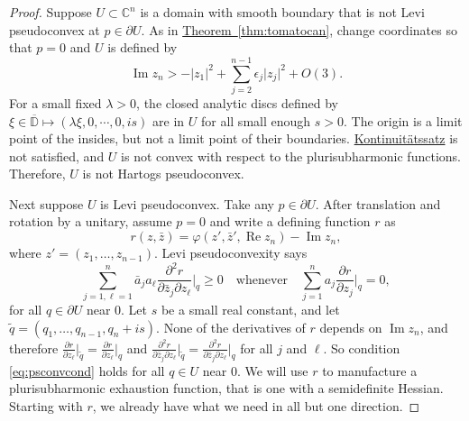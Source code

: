 \documentclass[12pt,openany]{book}
\renewcommand{\Re}{\operatorname{Re}}
\renewcommand{\Im}{\operatorname{Im}}
\newcommand{\sabs}[1]{\lvert {#1} \rvert}
\newcommand{\C}{{\mathbb{C}}}
\newcommand{\D}{{\mathbb{D}}}
\theoremstyle{plain}
\theoremstyle{remark}
\theoremstyle{definition}
\theoremstyle{exercise}
\theoremstyle{example}
\newcommand{\thmref}[1]{\hyperref[#1]{Theorem~\ref*{#1}}}
\begin{document}
\begin{proof}
Suppose
$U \subset \C^n$ is a domain with smooth boundary that is not
Levi pseudoconvex at $p \in \partial U$.
As in
\thmref{thm:tomatocan}, change coordinates so that $p=0$ and $U$ is defined
by
\begin{equation*}
\Im z_n > - \sabs{z_1}^2 + \sum_{j=2}^{n-1} \epsilon_j \sabs{z_j}^2 + O(3) .
\end{equation*}
For a small fixed $\lambda > 0$, the
closed analytic discs defined by $\xi \in \overline{\D} \mapsto (\lambda \xi, 0, \cdots, 0, is)$
are in $U$ for all small enough $s > 0$.  The origin
is a limit point of the insides, but not a limit point of their boundaries.
\hyperref[thm:contprinciple]{Kontinuit\"atssatz} is not satisfied, and $U$ is not 
convex with respect to the plurisubharmonic functions.  Therefore,
$U$ is not Hartogs pseudoconvex.

Next suppose $U$ is Levi pseudoconvex.  Take any $p \in \partial U$.
After translation and rotation by a unitary, assume $p=0$ and
write a defining function $r$ as
\begin{equation*}
r(z,\bar{z}) = \varphi(z',\bar{z}',\Re z_n) - \Im z_n ,
\end{equation*}
where $z' = (z_1,\ldots,z_{n-1})$.
Levi pseudoconvexity says 
\begin{equation} \label{eq:psconvcond}
\sum_{j=1,\ell=1}^n
\bar{a}_j a_\ell \frac{\partial^2 r}{\partial \bar{z}_j \partial z_\ell} \Big|_q \geq 0 
\quad \text{whenever} \quad
\sum_{j=1}^n
a_j \frac{\partial r}{\partial z_j} \Big|_q = 0 ,
\end{equation}
for all $q \in \partial U$ near $0$.
Let $s$ be a small real constant,
and let $\widetilde{q} = (q_1,\ldots,q_{n-1},q_n + is)$.
None of the derivatives of $r$ depends on $\Im z_n$, and therefore
$\frac{\partial r}{\partial z_\ell} \big|_{\widetilde{q}} =
\frac{\partial r}{\partial z_\ell} \big|_{q}$ and
$\frac{\partial^2 r}{\partial \bar{z}_j \partial z_\ell} \big|_{\widetilde{q}} =
\frac{\partial^2 r}{\partial \bar{z}_j \partial z_\ell} \big|_{q}$
for all $j$ and $\ell$.
So condition \eqref{eq:psconvcond} holds for all $q \in U$ near $0$.
We will use $r$ to manufacture a plurisubharmonic exhaustion function, that
is one with a semidefinite Hessian.  Starting with $r$, we already
have what we need in all but one direction.


\end{proof}
\end{document}

